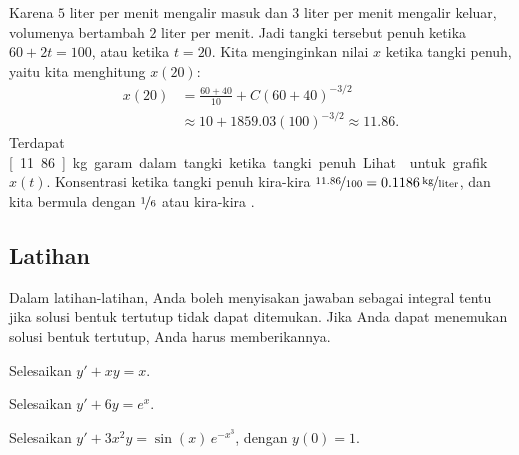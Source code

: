\begin{example}
Karena $5$ liter per menit mengalir masuk dan $3$ liter per menit mengalir keluar,
volumenya bertambah $2$ liter per menit.
Jadi tangki tersebut
penuh ketika $60+2t = 100$, atau ketika $t=20$.
Kita menginginkan nilai $x$ ketika tangki penuh,
yaitu kita menghitung $x(20)$:
\begin{equation*}
\begin{split}
x(20) & =
\frac{60+40}{10}
+C{(60+40)}^{-3/2}
\\
& \approx
10
+1859.03 {(100)}^{-3/2}
\approx
11.86 .
\end{split}
\end{equation*}
Terdapat \unit[11.86]{kg} garam dalam tangki ketika tangki penuh.
Lihat  untuk grafik $x(t)$.
Konsentrasi ketika tangki penuh kira-kira
$\nicefrac{11.86}{100} = \unitfrac[0.1186]{kg}{liter}$, dan kita bermula
dengan $\nicefrac{1}{6}$ atau kira-kira .
\end{example}

\subsection{Latihan}

Dalam latihan-latihan, Anda boleh menyisakan jawaban sebagai integral tentu jika
solusi bentuk tertutup tidak dapat ditemukan. Jika Anda dapat menemukan solusi bentuk
tertutup, Anda harus memberikannya.

\begin{exercise}
Selesaikan $y' + xy = x$.
\end{exercise}

\begin{exercise}
Selesaikan $y' + 6y = e^x$.
\end{exercise}

\begin{exercise}
Selesaikan $y' + 3x^2y = \sin(x) \, e^{-x^3}$, dengan $y(0) = 1$.
\end{exercise}

